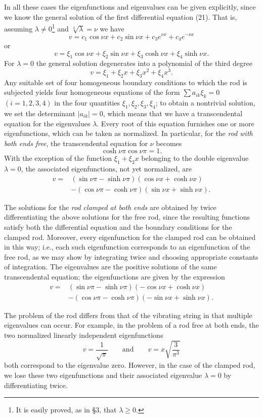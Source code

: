 In all these cases the eigenfunctions and eigenvalues can be given explicitly, since we know the general solution of the first differential equation (21). That is, assuming $\lambda\ne0$\footnote{It is easily proved, as in \S3, that $\lambda\ge0$.} and $\sqrt[4]\lambda=\nu$ we have
\[
v=c_1\cos\nu x+c_2\sin\nu x+c_3e^{\nu x}+c_4e^{-\nu x}
\]
or
\[
v=\xi_1\cos\nu x+\xi_2\sin\nu x+\xi_3\cosh\nu x+\xi_4\sinh\nu x.
\]
For $\lambda=0$ the general solution degenerates into a polynomial of the third degree
\[
v=\xi_1+\xi_2x+\xi_3x^2+\xi_4x^3.
\]
Any suitable set of four homogeneous boundary conditions to which the rod is subjected yields four homogeneous equations of the form $\sum a_{ik}\xi_k=0$ $(i=1,2,3,4)$ in the four quantities $\xi_1,\xi_2,\xi_3,\xi_4$; to obtain a nontrivial solution, we set the determinant $|a_{ik}|=0$, which means that we have a transcendental equation for the eigenvalues $\lambda$. Every root of this equation furnishes one or more eigenfunctions, which can be taken as normalized. In particular, for the \emph{rod with both ends free}, the transcendental equation for $\nu$ becomes
\[
\cosh\nu\pi\cos\nu\pi=1.
\]
With the exception of the function $\xi_1+\xi_2x$ belonging to the double eigenvalue $\lambda=0$, the associated eigenfunctions, not yet normalized, are
\[
\begin{aligned}
v={}&(\sin\nu\pi-\sinh\nu\pi)(\cos\nu x+\cosh\nu x)\\
&-(\cos\nu\pi-\cosh\nu\pi)(\sin\nu x+\sinh\nu x).
\end{aligned}
\]

The solutions for the \emph{rod clamped at both ends} are obtained by twice differentiating the above solutions for the free rod, since the resulting functions satisfy both the differential equation and the boundary conditions for the clamped rod. Moreover, every eigenfunction for the clamped rod can be obtained in this way; i.e., each such eigenfunction corresponds to an eigenfunction of the free rod, as we may show by integrating twice and choosing appropriate constants of integration. The eigenvalues are the positive solutions of the same transcendental equation; the eigenfunctions are given by the expression
\[
\begin{aligned}
v={}&(\sin\nu\pi-\sinh\nu\pi)(-\cos\nu x+\cosh\nu x)\\
&-(\cos\nu\pi-\cosh\nu\pi)(-\sin\nu x+\sinh\nu x).
\end{aligned}
\]

The problem of the rod differs from that of the vibrating string in that multiple eigenvalues can occur. For example, in the problem of a rod free at both ends, the two normalized linearly independent eigenfunctions
\[
v=\frac1{\sqrt\pi}
\qquad\text{and}\qquad
v=x\sqrt{\frac3{\pi^3}}
\]
both correspond to the eigenvalue zero. However, in the case of the clamped rod, we lose these two eigenfunctions and their associated eigenvalue $\lambda=0$ by differentiating twice.

